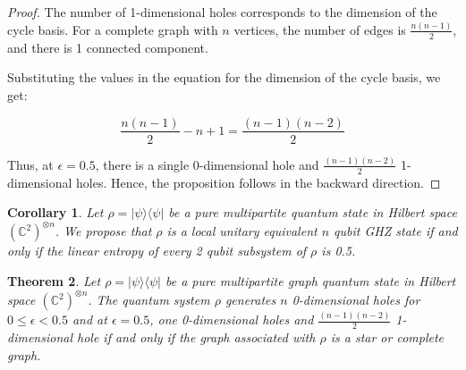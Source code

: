 \documentclass{article}
\newtheorem{theorem}{Theorem}
\newtheorem{corollary}[theorem]{Corollary}
\newcommand{\ket}[1]{|#1\rangle}
\newcommand{\bra}[1]{\langle #1|}
\begin{document}
\begin{proof}
The number of 1-dimensional holes corresponds to the dimension of the cycle basis. For a complete graph with $ n $ vertices, the number of edges is $ \frac{n(n-1)}{2} $, and there is 1 connected component. 


Substituting the values in the equation for the dimension of the cycle basis, we get:

\begin{equation}
\frac{n(n-1)}{2} - n + 1 = \frac{(n-1)(n-2)}{2}
\end{equation}


Thus, at $ \epsilon = 0.5 $, there is a single 0-dimensional hole and $ \frac{(n-1)(n-2)}{2} $ 1-dimensional holes. Hence, the proposition follows in the backward direction.
\end{proof}

\begin{corollary}
Let $\rho = \ket{\psi}\bra{\psi}$ be a pure multipartite quantum state in Hilbert space $(\mathbb{C}^2)^{\otimes n}$. We propose that $\rho$ is a local unitary equivalent $n$ qubit GHZ state if and only if the linear entropy of every 2 qubit subsystem of $\rho$ is 0.5.
\end{corollary}

\begin{theorem}
    Let $\rho = \ket{\psi}\bra{\psi}$ be a pure multipartite graph quantum state in Hilbert space $(\mathbb{C}^2)^{\otimes n}$. The quantum system $\rho$ generates $n$ 0-dimensional holes for $0 \leq \epsilon < 0.5$ and at $\epsilon = 0.5$, one 0-dimensional holes and $\frac{(n-1)(n-2)}{2}$ 1-dimensional hole if and only if the graph associated with $\rho$ is a star or complete graph.
\end{theorem}





\end{document}
